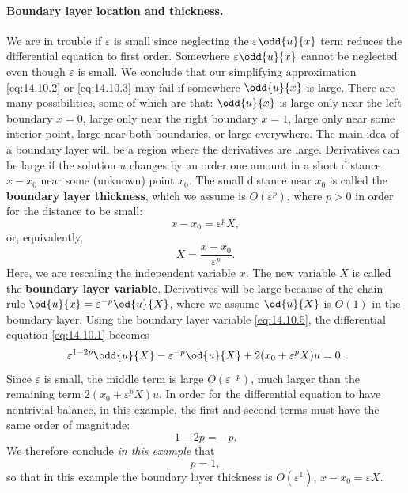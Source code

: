 \paragraph{Boundary layer location and thickness.}
We are in trouble if $\varepsilon$ is small since neglecting the $\varepsilon\odd{u}{x}$ term reduces the differential equation to first order. Somewhere $\varepsilon\odd{u}{x}$ cannot be neglected even though $\varepsilon$ is small. We conclude that our simplifying approximation \eqref{eq:14.10.2} or \eqref{eq:14.10.3} may fail if somewhere $\odd{u}{x}$ is large. There are many possibilities, some of which are that: $\odd{u}{x}$ is large only near the left boundary $x = 0$, large only near the right boundary $x = 1$, large only near some interior point, large near both boundaries, or large everywhere. The main idea of a boundary layer will be a region where the derivatives are large. Derivatives can be large if the solution $u$ changes by an order one amount in a short distance $x - x_0$ near some (unknown) point $x_0$. The small distance near $x_0$ is called the \textbf{boundary layer thickness}, which we assume is $O(\varepsilon^p)$, where $p > 0$ in order for the distance to be small:
\begin{equation}
x - x_0 = \varepsilon^p X,
\label{eq:14.10.4}
\end{equation}
or, equivalently,
\begin{equation}
X = \frac{x - x_0}{\varepsilon^p}.
\label{eq:14.10.5}
\end{equation}
Here, we are rescaling the independent variable $x$. The new variable $X$ is called the \textbf{boundary layer variable}. Derivatives will be large because of the chain rule $\od{u}{x} = \varepsilon^{-p}\od{u}{X}$, where we assume $\od{u}{X}$ is $O(1)$ in the boundary layer. Using the boundary layer variable \eqref{eq:14.10.5}, the differential equation \eqref{eq:14.10.1} becomes
\begin{equation}
\varepsilon^{1-2p}\odd{u}{X} - \varepsilon^{-p}\od{u}{X} + 2(x_0 + \varepsilon^p X)u = 0.
\label{eq:14.10.6}
\end{equation}
Since $\varepsilon$ is small, the middle term is large $O(\varepsilon^{-p})$, much larger than the remaining term $2(x_0 + \varepsilon^p X)u$. In order for the differential equation to have nontrivial balance, in this example, the first and second terms must have the same order of magnitude:
\begin{equation}
1 - 2p = -p.
\label{eq:14.10.7}
\end{equation}
We therefore conclude \emph{in this example} that
\begin{equation}
p = 1,
\label{eq:14.10.8}
\end{equation}
so that in this example the boundary layer thickness is $O(\varepsilon^1)$, $x - x_0 = \varepsilon X$.

